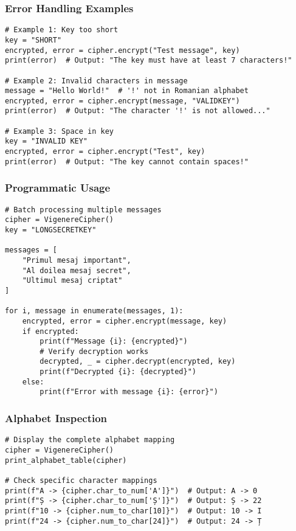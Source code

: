 \documentclass[12pt]{article}
\begin{document}
\subsubsection*{Error Handling Examples}
\begin{verbatim}
# Example 1: Key too short
key = "SHORT"
encrypted, error = cipher.encrypt("Test message", key)
print(error)  # Output: "The key must have at least 7 characters!"

# Example 2: Invalid characters in message
message = "Hello World!"  # '!' not in Romanian alphabet
encrypted, error = cipher.encrypt(message, "VALIDKEY")
print(error)  # Output: "The character '!' is not allowed..."

# Example 3: Space in key
key = "INVALID KEY"
encrypted, error = cipher.encrypt("Test", key)
print(error)  # Output: "The key cannot contain spaces!"
\end{verbatim}

\subsubsection*{Programmatic Usage}
\begin{verbatim}
# Batch processing multiple messages
cipher = VigenereCipher()
key = "LONGSECRETKEY"

messages = [
    "Primul mesaj important",
    "Al doilea mesaj secret",
    "Ultimul mesaj criptat"
]

for i, message in enumerate(messages, 1):
    encrypted, error = cipher.encrypt(message, key)
    if encrypted:
        print(f"Message {i}: {encrypted}")
        # Verify decryption works
        decrypted, _ = cipher.decrypt(encrypted, key)
        print(f"Decrypted {i}: {decrypted}")
    else:
        print(f"Error with message {i}: {error}")
\end{verbatim}

\subsubsection*{Alphabet Inspection}
\begin{verbatim}
# Display the complete alphabet mapping
cipher = VigenereCipher()
print_alphabet_table(cipher)

# Check specific character mappings
print(f"A -> {cipher.char_to_num['A']}")  # Output: A -> 0
print(f"Ș -> {cipher.char_to_num['Ș']}")  # Output: Ș -> 22
print(f"10 -> {cipher.num_to_char[10]}")  # Output: 10 -> I
print(f"24 -> {cipher.num_to_char[24]}")  # Output: 24 -> Ț
\end{verbatim}
\end{document}
